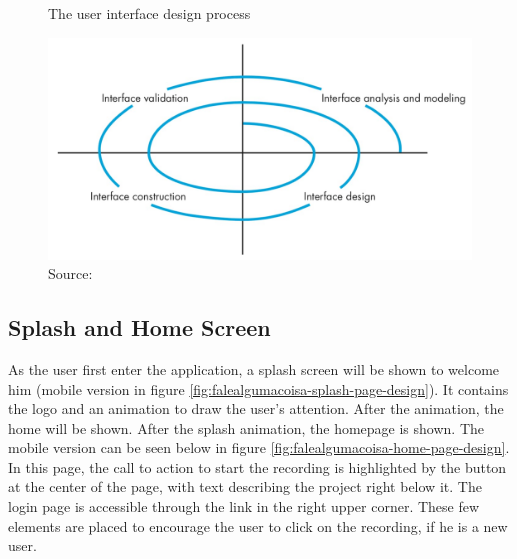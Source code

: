 \begin{figure}[h]
    \centering
    \caption{The user interface design process}
    \label{fig:user-interface-design-process}
    \includegraphics[width=.8\linewidth]{images/sw-req-spec/user-interface-design-process.jpg}
    \caption*{Source: \cite{pressman2014software}}
\end{figure}

\clearpage
\subsection{Splash and Home Screen}

As the user first enter the application, a splash screen will be shown to welcome him (mobile version in figure \ref{fig:falealgumacoisa-splash-page-design}). It contains the logo and an animation to draw the user's attention. After the animation, the home will be shown. After the splash animation, the homepage is shown. The mobile version can be seen below in figure \ref{fig:falealgumacoisa-home-page-design}. In this page, the call to action to start the recording is highlighted by the button at the center of the page, with text describing the project right below it. The login page is accessible through the link in the right upper corner. These few elements are placed to encourage the user to click on the recording, if he is a new user.

